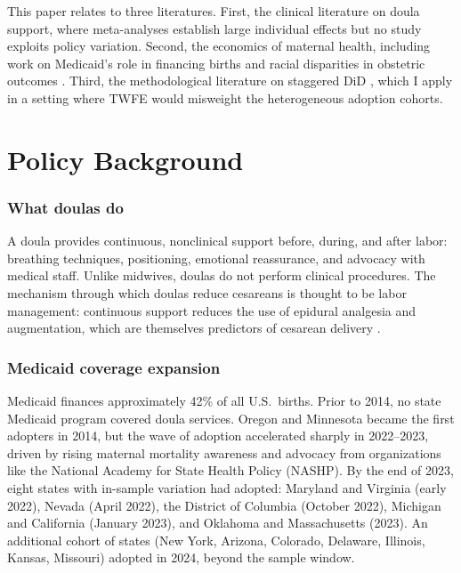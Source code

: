 \documentclass[12pt]{article}
\begin{document}
This paper relates to three literatures. First, the clinical literature on doula support, where meta-analyses establish large individual effects \citep{bohren2017, hodnett2002} but no study exploits policy variation. Second, the economics of maternal health, including work on Medicaid's role in financing births \citep{kozhimannil2017, kozhimannil2016} and racial disparities in obstetric outcomes \citep{howell2018}. Third, the methodological literature on staggered DiD \citep{callaway2021, goodmanbacon2021, deChaisemartin2020, roth2023}, which I apply in a setting where TWFE would misweight the heterogeneous adoption cohorts.


\section{Policy Background}

\subsubsection*{What doulas do} A doula provides continuous, nonclinical support before, during, and after labor: breathing techniques, positioning, emotional reassurance, and advocacy with medical staff. Unlike midwives, doulas do not perform clinical procedures. The mechanism through which doulas reduce cesareans is thought to be labor management: continuous support reduces the use of epidural analgesia and augmentation, which are themselves predictors of cesarean delivery \citep{bohren2017}.

\subsubsection*{Medicaid coverage expansion} Medicaid finances approximately 42\% of all U.S.\ births. Prior to 2014, no state Medicaid program covered doula services. Oregon and Minnesota became the first adopters in 2014, but the wave of adoption accelerated sharply in 2022--2023, driven by rising maternal mortality awareness and advocacy from organizations like the National Academy for State Health Policy (NASHP). By the end of 2023, eight states with in-sample variation had adopted: Maryland and Virginia (early 2022), Nevada (April 2022), the District of Columbia (October 2022), Michigan and California (January 2023), and Oklahoma and Massachusetts (2023). An additional cohort of states (New York, Arizona, Colorado, Delaware, Illinois, Kansas, Missouri) adopted in 2024, beyond the sample window.
\end{document}
